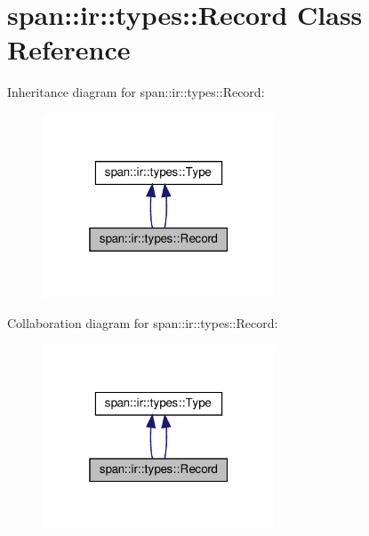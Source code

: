 \hypertarget{classspan_1_1ir_1_1types_1_1Record}{}\section{span\+:\+:ir\+:\+:types\+:\+:Record Class Reference}
\label{classspan_1_1ir_1_1types_1_1Record}


Inheritance diagram for span\+:\+:ir\+:\+:types\+:\+:Record\+:\nopagebreak
\begin{figure}[H]
\begin{center}
\leavevmode
\includegraphics[width=196pt]{classspan_1_1ir_1_1types_1_1Record__inherit__graph}
\end{center}
\end{figure}


Collaboration diagram for span\+:\+:ir\+:\+:types\+:\+:Record\+:\nopagebreak
\begin{figure}[H]
\begin{center}
\leavevmode
\includegraphics[width=196pt]{classspan_1_1ir_1_1types_1_1Record__coll__graph}
\end{center}
\end{figure}
